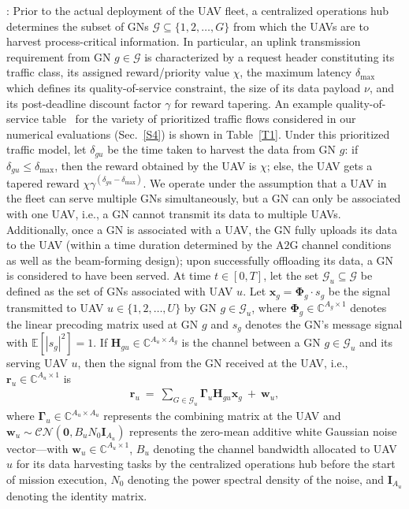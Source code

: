 \documentclass[10pt, twocolumn]{IEEEtran}
\begin{document}
: Prior to the actual deployment of the UAV fleet, a centralized operations hub determines the subset of GNs $\mathcal{G}{\subseteq}\{1,2,{\dots},G\}$ from which the UAVs are to harvest process-critical information. In particular, an uplink transmission requirement from GN $g{\in}\mathcal{G}$ is characterized by a request header constituting its traffic class, its assigned reward/priority value $\chi$, the maximum latency $\delta_{\mathrm{max}}$ which defines its quality-of-service constraint, the size of its data payload $\nu$, and its post-deadline discount factor $\gamma$ for reward tapering. An example quality-of-service table~\cite{DARPA:SC2} for the variety of prioritized traffic flows considered in our numerical evaluations (Sec.~\ref{S4}) is shown in Table~\ref{T1}. Under this prioritized traffic model, let $\delta_{gu}$ be the time taken to harvest the data from GN $g$: if $\delta_{gu}{\leq}\delta_{\mathrm{max}}$, then the reward obtained by the UAV is $\chi$; else, the UAV gets a tapered reward $\chi \gamma^{(\delta_{gu}{-}\delta_{\mathrm{max}})}$. We operate under the assumption that a UAV in the fleet can serve multiple GNs simultaneously, but a GN can only be associated with one UAV, i.e., a GN cannot transmit its data to multiple UAVs. Additionally, once a GN is associated with a UAV, the GN fully uploads its data to the UAV (within a time duration determined by the A$2$G channel conditions as well as the beam-forming design); upon successfully offloading its data, a GN is considered to have been served. At time $t{\in}[0,T]$, let the set $\mathcal{G}_{u}{\subseteq}\mathcal{G}$ be defined as the set of GNs associated with UAV $u$. Let $\mathbf{x}_{g}{=}\boldsymbol{\Phi}_{g}{\cdot}s_{g}$ be the signal transmitted to UAV $u{\in}\{1,2,{\dots},U\}$ by GN $g{\in}\mathcal{G}_{u}$, where $\boldsymbol{\Phi}_{g}{\in}\mathbb{C}^{A_{g}{\times}1}$ denotes the linear precoding matrix used at GN $g$ and $s_{g}$ denotes the GN's message signal with $\mathbb{E}[|s_{g}|^{2}]{=}1$. If $\mathbf{H}_{gu}{\in}\mathbb{C}^{A_{u}{\times}A_{g}}$ is the channel between a GN $g{\in}\mathcal{G}_{u}$ and its serving UAV $u$, then the signal from the GN received at the UAV, i.e., $\mathbf{r}_{u}{\in}\mathbb{C}^{A_{u}{\times}1}$ is
\vspace{-0.3mm}
\begin{align}
    \mathbf{r}_{u}\ =\ \sum_{G{\in}\mathcal{G}_{u}} \boldsymbol{\Gamma}_{u}\mathbf{H}_{gu}\mathbf{x}_{g}\ +\ \mathbf{w}_{u},
\end{align}
where $\boldsymbol{\Gamma}_{u}{\in}\mathbb{C}^{A_{u}{\times}A_{u}}$ represents the combining matrix at the UAV and $\mathbf{w}_{u}{\sim}\mathcal{CN}(\mathbf{0},B_{u}N_{0}\mathbf{I}_{A_{u}})$ represents the zero-mean additive white Gaussian noise vector---with $\mathbf{w}_{u}{\in}\mathbb{C}^{A_{u}{\times}1}$, $B_{u}$ denoting the channel bandwidth allocated to UAV $u$ for its data harvesting tasks by the centralized operations hub before the start of mission execution, $N_{0}$ denoting the power spectral density of the noise, and $\mathbf{I}_{A_{u}}$ denoting the identity matrix.\\
\end{document}
